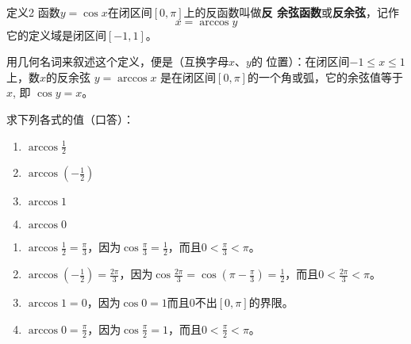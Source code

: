 \begin{blk}{定义2 }
    函数$y=\cos x$在闭区间$[0,\pi]$上的反函数叫做\textbf{反
余弦函数}或\textbf{反余弦}，记作
\[x=\arccos y\]
它的定义域是闭区间$[-1,1]$。
\end{blk}

用几何名词来叙述这个定义，便是（互换字母$x$、$y$的
位置）：在闭区间$-1\le x\le 1$上，数$x$的反余弦
$y=\arccos x$
是在闭区间$[0,\pi]$的一个角或弧，它的余弦值等于$x$, 即
$\cos y=x$。

\begin{example}
    求下列各式的值（口答）：
    \begin{multicols}{2}
\begin{enumerate}
    \item $\arccos\frac{1}{2}$
    \item $\arccos\left(-\frac{1}{2}\right)$
    \item $\arccos1$
    \item $\arccos0$
\end{enumerate}
    \end{multicols}
\end{example}

\begin{solution}
\begin{enumerate}
    \item $\arccos\frac{1}{2}=\frac{\pi}{3}$，因为$\cos\frac{\pi}{3}=\frac{1}{2}$，而且$0<\frac{\pi}{3}<\pi$。
    \item $\arccos\left(-\frac{1}{2}\right)=\frac{2\pi}{3}$，因为$\cos\frac{2\pi}{3}=\cos\left(\pi-\frac{\pi}{3}\right)=\frac{1}{2}$，而且$0<\frac{2\pi}{3}<\pi$。
    \item $\arccos1=0$，因为$\cos 0=1$而且0不出$[0,\pi]$的界限。
    \item $\arccos0=\frac{\pi}{2}$，因为$\cos\frac{\pi}{2}=1$，而且$0<\frac{\pi}{2}<\pi$。
\end{enumerate}
\end{solution}

